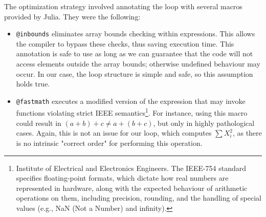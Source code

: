\documentclass[12pt,	%
	a4paper,		%
	twoside,		%
	openright,		%
	titlepage,%
	]{book}
\theoremstyle{definition}
\newcommand{\mjline}[1]{\texttt{#1}}
\begin{document}
The optimization strategy involved annotating the loop with several macros provided by Julia. They were the following:
\begin{itemize}
    \item \mjline{@inbounds} eliminates array bounds checking within expressions. This allows the compiler to bypass these checks, thus saving execution time. This annotation is safe to use as long as we can guarantee that the code will not access elements outside the array bounds; otherwise undefined behaviour may occur. In our case, the loop structure is simple and safe, so this assumption holds true.


    \item \mjline{@fastmath} executes a modified version of the expression that may invoke functions violating strict IEEE semantics\footnote{Institute of Electrical and Electronics Engineers. The IEEE-754 standard specifies floating-point formats, which dictate how real numbers are represented in hardware, along with the expected behaviour of arithmetic operations on them, including precision, rounding, and the handling of special values (e.g., NaN (Not a Number) and infinity).}. For instance, using this macro could result in $(a+b)+c \neq a+(b+c)$, but only in highly pathological cases. Again, this is not an issue for our loop, which computes $\sum X_i^2$, as there is no intrinsic "correct order" for performing this operation.


\end{itemize}
\end{document}
